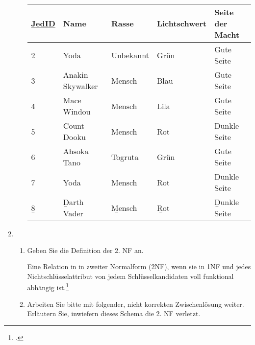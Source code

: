 \documentclass{bschlangaul-aufgabe}
\begin{document}
\begin{enumerate}
\begin{enumerate}
\begin{liAntwort}
\begin{center}
\begin{tabular}{|l|l|l|l|l|}
\hline
\underline{JedID} & Name             & Rasse        & Lichtschwert & Seite der Macht\\\hline\hline
2     & Yoda             & Unbekannt & Grün         & Gute Seite\\\hline
3     & Anakin Skywalker & Mensch    & Blau         & Gute Seite\\\hline
4     & Mace Windou      & Mensch    & Lila         & Gute Seite\\\hline
5     & Count Dooku      & Mensch    & Rot          & Dunkle Seite\\\hline
6     & Ahsoka Tano      & Togruta   & Grün         & Gute Seite\\\hline
7     & Yoda             & Mensch    & Rot          & Dunkle Seite\\\hline
\b{8}     & \b{Darth Vader}      & \b{Mensch}    & \b{Rot}          & \b{Dunkle Seite}\\\hline
\end{tabular}
\end{center}
\end{liAntwort}

\end{enumerate}


\item \strut

\begin{enumerate}


\item Geben Sie die Definition der 2. NF an.

\begin{liAntwort}
Eine Relation in in zweiter Normalform (2NF), wenn sie in 1NF und jedes
Nichtschlüsselattribut von jedem Schlüsselkandidaten voll funktional
abhängig ist.\footcite[Seite 449]{schneider}
\end{liAntwort}


\item Arbeiten Sie bitte mit folgender, nicht korrekten Zwischenlösung weiter.
Erläutern Sie, inwiefern dieses Schema die 2. NF verletzt.


\end{enumerate}
\end{enumerate}
\end{document}
